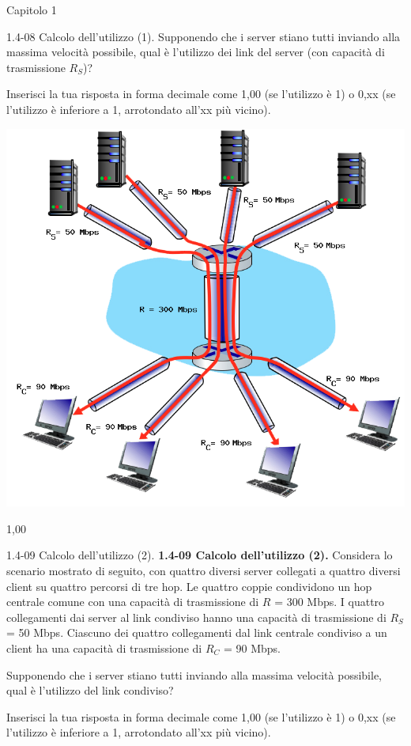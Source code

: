 \documentclass[a4paper]{article}
\begin{document}
\begin{quiz}{Capitolo 1}
\begin{shortanswer}[points=1,shuffle=true]{1.4-08 Calcolo dell'utilizzo (1).}
Supponendo che i server stiano tutti inviando alla massima velocità possibile, qual è l'utilizzo dei link del server (con capacità di trasmissione $R_S$)? 

Inserisci la tua risposta in forma decimale come 1,00 (se l'utilizzo è 1) o 0,xx (se l'utilizzo è inferiore a 1, arrotondato all'xx più vicino). 

\begin{center}
\includegraphics[width=0.7\linewidth]{figs/1.4.7.png}
\end{center}
\item 1,00
\end{shortanswer}

\begin{shortanswer}[points=1,shuffle=true]{1.4-09 Calcolo dell'utilizzo (2).}
\textbf{1.4-09 Calcolo dell'utilizzo (2).} 
Considera lo scenario mostrato di seguito, con quattro diversi server collegati a quattro diversi client su quattro percorsi di tre hop. Le quattro coppie condividono un hop centrale comune con una capacità di trasmissione di $R$ = 300 Mbps. I quattro collegamenti dai server al link condiviso hanno una capacità di trasmissione di $R_S$ = 50 Mbps. Ciascuno dei quattro collegamenti dal link centrale condiviso a un client ha una capacità di trasmissione di $R_C$ = 90 Mbps. 

Supponendo che i server stiano tutti inviando alla massima velocità possibile, qual è l'utilizzo del link condiviso? 

Inserisci la tua risposta in forma decimale come 1,00 (se l'utilizzo è 1) o 0,xx (se l'utilizzo è inferiore a 1, arrotondato all'xx più vicino). 


\end{shortanswer}
\end{quiz}
\end{document}
